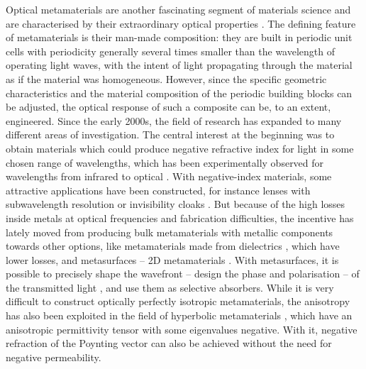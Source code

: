 \documentclass[a4paper,11pt]{article}
\begin{document}
Optical metamaterials are another fascinating segment of materials science and are characterised by their extraordinary optical properties \cite{wegener-2011-nature-review}.
The defining feature of metamaterials is their man-made composition: they are built in periodic unit cells with periodicity generally several times smaller than the wavelength of operating light waves, with the intent of light propagating through the material as if the material was homogeneous. 
However, since the specific geometric characteristics and the material composition of the periodic building blocks can be adjusted, the optical response of such a composite can be, to an extent, engineered. 
Since the early 2000s, the field of research has expanded to many different areas of investigation. 
The central interest at the beginning was to obtain materials which could produce negative refractive index for light in some chosen range of wavelengths, which has been experimentally observed for wavelengths from infrared to optical \cite{schultz-2000-first-mtm,zhang-2008-fishnet}. 
With negative-index materials, some attractive applications have been constructed, for instance lenses with subwavelength resolution or invisibility cloaks \cite{capasso-2016-metalens,zhang-2015-skin-cloak}. 
But because of the high losses inside metals at optical frequencies and fabrication difficulties, the incentive has lately moved from producing bulk metamaterials with metallic components towards other options, like metamaterials made from dielectrics \cite{jacob-2016-all-dielectric}, which have lower losses, and metasurfaces -- 2D metamaterials \cite{capasso-2014-flat-optics-metasurface}. 
With metasurfaces, it is possible to precisely shape the wavefront -- design the phase and polarisation -- of the transmitted light \cite{capasso-2014-flat-optics-metasurface}, and use them as selective absorbers. 
While it is very difficult to construct optically perfectly isotropic metamaterials, the anisotropy has also been exploited in the field of hyperbolic metamaterials \cite{kivshar-2013-hyperbolic}, which have an anisotropic permittivity tensor with some eigenvalues negative. 
With it, negative refraction of the Poynting vector can also be achieved without the need for negative permeability.

\end{document}
